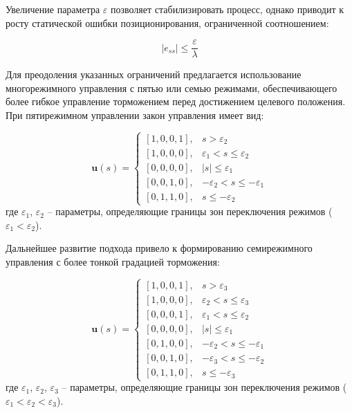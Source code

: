 Увеличение параметра $\varepsilon$ позволяет стабилизировать процесс, однако приводит к
росту статической ошибки позиционирования, ограниченной соотношением:

\begin{equation*}
|e_{ss}| \leq \frac{\varepsilon}{\lambda}
\end{equation*}

Для преодоления указанных ограничений предлагается использование многорежимного управления
с пятью или семью режимами, обеспечивающего более гибкое управление торможением
перед достижением целевого положения. При пятирежимном управлении закон управления имеет вид:

\begin{equation}\label{eq:control_law_5_mode}
\mathbf{u}(s) = \begin{cases}
[1,0,0,1], & s > \varepsilon_2 \\
[1,0,0,0], & \varepsilon_1 < s \leq \varepsilon_2 \\
[0,0,0,0], & |s| \leq \varepsilon_1 \\
[0,0,1,0], & -\varepsilon_2 < s \leq -\varepsilon_1 \\
[0,1,1,0], & s \leq -\varepsilon_2
\end{cases}
\end{equation}
где $\varepsilon_1$, $\varepsilon_2$ -- параметры, определяющие границы зон переключения режимов ($\varepsilon_1 < \varepsilon_2$).

Дальнейшее развитие подхода привело к формированию семирежимного управления с более тонкой градацией торможения:

\begin{equation}\label{eq:control_law_7_mode}
\mathbf{u}(s) = \begin{cases}
[1,0,0,1], & s > \varepsilon_3 \\
[1,0,0,0], & \varepsilon_2 < s \leq \varepsilon_3 \\
[0,0,0,1], & \varepsilon_1 < s \leq \varepsilon_2 \\
[0,0,0,0], & |s| \leq \varepsilon_1 \\
[0,1,0,0], & -\varepsilon_2 < s \leq -\varepsilon_1 \\
[0,0,1,0], & -\varepsilon_3 < s \leq -\varepsilon_2 \\
[0,1,1,0], & s \leq -\varepsilon_3
\end{cases}
\end{equation}
где $\varepsilon_1$, $\varepsilon_2$, $\varepsilon_3$ -- параметры, определяющие границы зон переключения режимов ($\varepsilon_1 < \varepsilon_2 < \varepsilon_3$).

